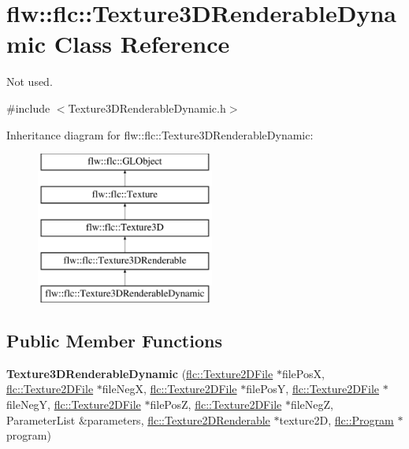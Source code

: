 \hypertarget{classflw_1_1flc_1_1Texture3DRenderableDynamic}{}\section{flw\+:\+:flc\+:\+:Texture3\+D\+Renderable\+Dynamic Class Reference}
\label{classflw_1_1flc_1_1Texture3DRenderableDynamic}


Not used.  




{\ttfamily \#include $<$Texture3\+D\+Renderable\+Dynamic.\+h$>$}

Inheritance diagram for flw\+:\+:flc\+:\+:Texture3\+D\+Renderable\+Dynamic\+:\begin{figure}[H]
\begin{center}
\leavevmode
\includegraphics[height=5.000000cm]{classflw_1_1flc_1_1Texture3DRenderableDynamic}
\end{center}
\end{figure}
\subsection*{Public Member Functions}
\begin{DoxyCompactItemize}
\item 
\mbox{\label{classflw_1_1flc_1_1Texture3DRenderableDynamic_a4995ffe35befb5c105dffa00e2d8a4ac}} 
{\bfseries Texture3\+D\+Renderable\+Dynamic} (\hyperlink{classflw_1_1flc_1_1Texture2DFile}{flc\+::\+Texture2\+D\+File} $\ast$file\+PosX, \hyperlink{classflw_1_1flc_1_1Texture2DFile}{flc\+::\+Texture2\+D\+File} $\ast$file\+NegX, \hyperlink{classflw_1_1flc_1_1Texture2DFile}{flc\+::\+Texture2\+D\+File} $\ast$file\+PosY, \hyperlink{classflw_1_1flc_1_1Texture2DFile}{flc\+::\+Texture2\+D\+File} $\ast$file\+NegY, \hyperlink{classflw_1_1flc_1_1Texture2DFile}{flc\+::\+Texture2\+D\+File} $\ast$file\+PosZ, \hyperlink{classflw_1_1flc_1_1Texture2DFile}{flc\+::\+Texture2\+D\+File} $\ast$file\+NegZ, Parameter\+List \&parameters, \hyperlink{classflw_1_1flc_1_1Texture2DRenderable}{flc\+::\+Texture2\+D\+Renderable} $\ast$texture2D, \hyperlink{classflw_1_1flc_1_1Program}{flc\+::\+Program} $\ast$program)
\end{DoxyCompactItemize}
